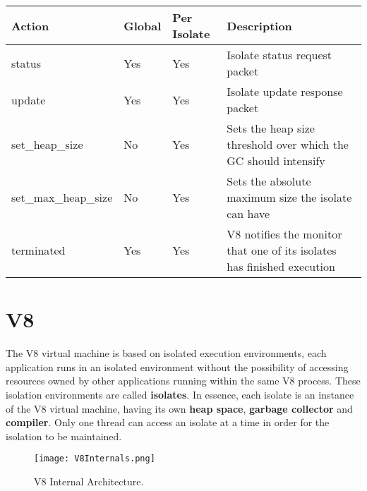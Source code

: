 \documentclass{l4proj}
\begin{document}
\begin{tabular}{  l  l  l  l  }
  Action & Global & Per Isolate & Description \\
\hline
  status & Yes & Yes & Isolate status request packet\\
  update & Yes & Yes & Isolate update response packet\\
  set\_heap\_size & No & Yes & Sets the heap size threshold over which the GC should intensify\\
  set\_max\_heap\_size & No & Yes & Sets the absolute maximum size the isolate can have\\
  terminated & Yes & Yes & V8 notifies the monitor that one of its isolates has finished execution\\
\hline
\end{tabular}
\section{V8}
\hspace*{3em} The V8 virtual machine is based on isolated execution environments, each application runs in an isolated environment without the possibility of accessing resources owned by other applications running within the same V8 process. These isolation environments are called \textbf{isolates}. In essence, each isolate is an instance of the V8 virtual machine, having its own \textbf{heap space}, \textbf{garbage collector} and \textbf{compiler}. Only one thread can access an isolate at a time in order for the isolation to be maintained. 

\begin{figure}[!ht]
  \centering
    \texttt{[image: V8Internals.png]}
	\caption{V8 Internal Architecture.}
\end{figure}
\end{document}
